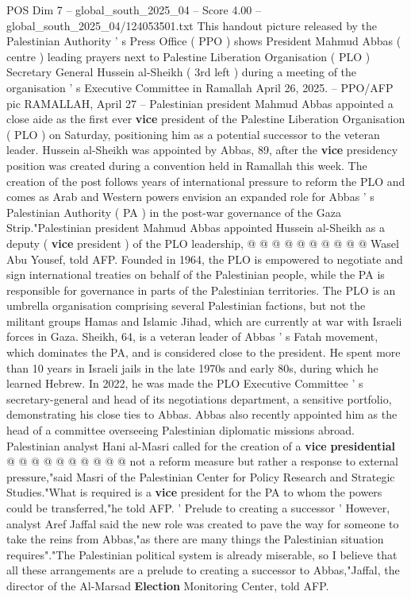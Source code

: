 \begin{textsample}{POS Dim 7 – global\_south\_2025\_04 – Score 4.00 – global\_south\_2025\_04/124053501.txt}  \label{ex:f7_pos_412}
This handout picture released by the Palestinian Authority ' s Press Office ( PPO ) shows President Mahmud Abbas ( centre ) leading prayers next to Palestine Liberation Organisation ( PLO ) Secretary General Hussein al-Sheikh ( 3rd left ) during a meeting of the organisation ' s Executive Committee in Ramallah April 26, 2025. -- PPO/AFP pic RAMALLAH, April 27 -- Palestinian president Mahmud Abbas appointed a close aide as the first ever \textbf{vice} president of the Palestine Liberation Organisation ( PLO ) on Saturday, positioning him as a potential successor to the veteran leader.
Hussein al-Sheikh was appointed by Abbas, 89, after the \textbf{vice} presidency position was created during a convention held in Ramallah this week.
The creation of the post follows years of international pressure to reform the PLO and comes as Arab and Western powers envision an expanded role for Abbas ' s Palestinian Authority ( PA ) in the post-war governance of the Gaza Strip."Palestinian president Mahmud Abbas appointed Hussein al-Sheikh as a deputy ( \textbf{vice} president ) of the PLO leadership, @ @ @ @ @ @ @ @ @ @ Wasel Abu Yousef, told AFP.
Founded in 1964, the PLO is empowered to negotiate and sign international treaties on behalf of the Palestinian people, while the PA is responsible for governance in parts of the Palestinian territories.
The PLO is an umbrella organisation comprising several Palestinian factions, but not the militant groups Hamas and Islamic Jihad, which are currently at war with Israeli forces in Gaza.
Sheikh, 64, is a veteran leader of Abbas ' s Fatah movement, which dominates the PA, and is considered close to the president.
He spent more than 10 years in Israeli jails in the late 1970s and early 80s, during which he learned Hebrew.
In 2022, he was made the PLO Executive Committee ' s secretary-general and head of its negotiations department, a sensitive portfolio, demonstrating his close ties to Abbas.
Abbas also recently appointed him as the head of a committee overseeing Palestinian diplomatic missions abroad.
Palestinian analyst Hani al-Masri called for the creation of a \textbf{vice} \textbf{presidential} @ @ @ @ @ @ @ @ @ @ not a reform measure but rather a response to external pressure,"said Masri of the Palestinian Center for Policy Research and Strategic Studies."What is required is a \textbf{vice} president for the PA to whom the powers could be transferred,"he told AFP. ' Prelude to creating a successor ' However, analyst Aref Jaffal said the new role was created to pave the way for someone to take the reins from Abbas,"as there are many things the Palestinian situation requires"."The Palestinian political system is already miserable, so I believe that all these arrangements are a prelude to creating a successor to Abbas,"Jaffal, the director of the Al-Marsad \textbf{Election} Monitoring Center, told AFP.

\end{textsample}

